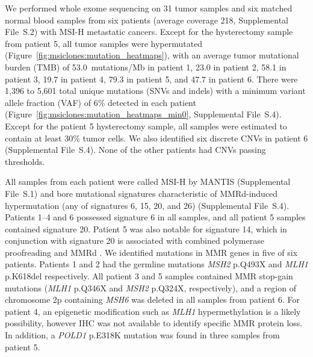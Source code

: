 We performed whole exome sequencing on 31 tumor samples and six matched normal blood samples from six patients (average coverage 218\texttimes{}, Supplemental File~S\thechapter{}.2) with MSI-H metastatic cancers. Except for the hysterectomy sample from patient 5, all tumor samples were hypermutated (Figure~\ref{fig:msiclones:mutation_heatmaps}), with an average tumor mutational burden (TMB) of 53.0~mutations/Mb in patient 1, 23.0 in patient 2, 58.1 in patient 3, 19.7 in patient 4, 79.3 in patient 5, and 47.7 in patient 6. There were 1,396 to 5,601 total unique mutations (SNVs and indels) with a minimum variant allele fraction (VAF) of 6\% detected in each patient (Figure~\ref{fig:msiclones:mutation_heatmaps_min0}, Supplemental File~S\thechapter{}.4). Except for the patient 5 hysterectomy sample, all samples were estimated to contain at least 30\% tumor cells. We also identified six discrete CNVs in patient 6 (Supplemental File~S\thechapter{}.4). None of the other patients had CNVs passing thresholds.

All samples from each patient were called MSI-H by MANTIS (Supplemental File~S\thechapter{}.1) and bore mutational signatures characteristic of MMRd-induced hypermutation (any of signatures 6, 15, 20, and 26) (Supplemental File~S\thechapter{}.4). Patients 1--4 and 6 possessed signature 6 in all samples, and all patient 5 samples contained signature 20. Patient 5 was also notable for signature 14, which in conjunction with signature 20 is associated with combined polymerase proofreading and MMRd \cite{haradhvala2018}. We identified mutations in MMR genes in five of six patients. Patients 1 and 2 had the germline mutations \textit{MSH2} p.Q493X and \textit{MLH1} p.K618del respectively. All patient 3 and 5 samples contained MMR stop-gain mutations (\textit{MLH1} p.Q346X and \textit{MSH2} p.Q324X, respectively), and a region of chromosome 2p containing \textit{MSH6} was deleted in all samples from patient 6. For patient 4, an epigenetic modification such as \textit{MLH1} hypermethylation is a likely possibility, however IHC was not available to identify specific MMR protein loss. In addition, a \textit{POLD1} p.E318K mutation was found in three samples from patient 5.

